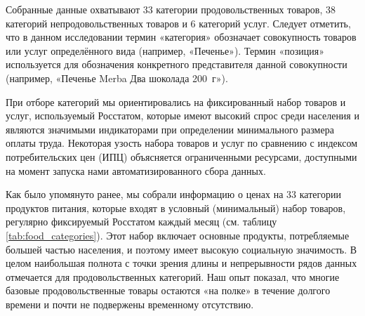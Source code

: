 Собранные данные охватывают 33 категории продовольственных товаров, 38 категорий непродовольственных товаров и 6 категорий услуг. Следует отметить, что в данном исследовании термин «категория» обозначает совокупность товаров или услуг определённого вида (например, «Печенье»). Термин «позиция» используется для обозначения конкретного представителя данной совокупности (например, «Печенье Merba Два шоколада 200~г»).

При отборе категорий мы ориентировались на фиксированный набор товаров и услуг, используемый Росстатом, которые имеют высокий спрос среди населения и являются значимыми индикаторами при определении минимального размера оплаты труда. Некоторая узость набора товаров и услуг по сравнению с индексом потребительских цен (ИПЦ) объясняется ограниченными ресурсами, доступными на момент запуска нами автоматизированного сбора данных.

Как было упомянуто ранее, мы собрали информацию о ценах на 33 категории продуктов питания, которые входят в условный (минимальный) набор товаров, регулярно фиксируемый Росстатом каждый месяц (см. таблицу \ref{tab:food_categories}). Этот набор включает основные продукты, потребляемые большей частью населения, и поэтому имеет высокую социальную значимость. В целом наибольшая полнота с точки зрения длины и непрерывности рядов данных отмечается для продовольственных категорий. Наш опыт показал, что многие базовые продовольственные товары остаются «на полке» в течение долгого времени и почти не подвержены временному отсутствию.

